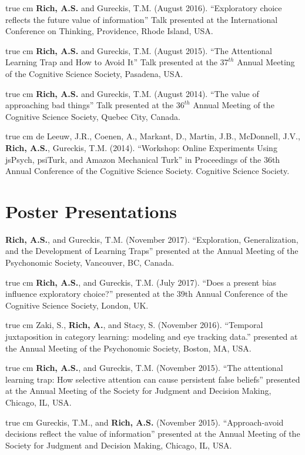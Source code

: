 \documentclass[12pt]{my_cv}
\def\ind{\hangindent=1 true cm\hangafter=1 \noindent}
\begin{document}
\ind \textbf{Rich, A.S.} and Gureckis, T.M. (August 2016). ``Exploratory choice
reflects the future value of information'' Talk presented at the International
Conference on Thinking, Providence, Rhode Island, USA.

\ind \textbf{Rich, A.S.} and Gureckis, T.M. (August 2015). ``The Attentional
Learning Trap and How to Avoid It'' Talk presented at the $37^{th}$ Annual Meeting of the
Cognitive Science Society, Pasadena, USA.

\ind \textbf{Rich, A.S.} and Gureckis, T.M. (August 2014). ``The value of
approaching bad things'' Talk presented at the $36^{th}$ Annual Meeting of the
Cognitive Science Society, Quebec City, Canada.

\ind de Leeuw, J.R., Coenen, A., Markant, D., Martin, J.B., McDonnell, J.V.,
\textbf{Rich, A.S.}, Gureckis, T.M. (2014). ``Workshop: Online Experiments Using
jsPsych, psiTurk, and Amazon Mechanical Turk'' in  Proceedings of the 36th Annual Conference of
the Cognitive Science Society. Cognitive Science Society.

\section{Poster Presentations}

\textbf{Rich, A.S.}, and Gureckis, T.M. (November 2017).
``Exploration, Generalization, and the Development of Learning Traps''
presented at the Annual Meeting of the Psychonomic Society, Vancouver, BC, Canada.

\ind \textbf{Rich, A.S.}, and Gureckis, T.M. (July 2017). ``Does a present bias
influence exploratory choice?'' presented at the 39th Annual Conference of
the Cognitive Science Society, London, UK.

\ind Zaki, S., \textbf{Rich, A.}, and Stacy, S. (November 2016).
``Temporal juxtaposition in category learning: modeling and eye tracking data.''
 presented at the Annual Meeting of the Psychonomic Society, Boston, MA, USA.

\ind \textbf{Rich, A.S.}, and Gureckis, T.M. (November 2015). ``The attentional
learning trap: How selective attention can cause persistent false beliefs''
presented at the Annual Meeting of the Society for Judgment and Decision
Making, Chicago, IL, USA.

\ind Gureckis, T.M., and \textbf{Rich, A.S.} (November 2015). ``Approach-avoid
decisions reflect the value of information'' presented at the Annual
Meeting of the Society for Judgment and Decision Making, Chicago, IL, USA.
\end{document}
